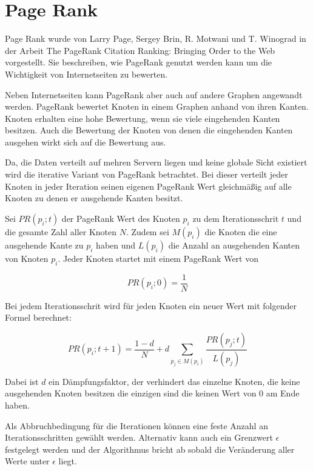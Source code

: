 \section{Page Rank}

Page Rank wurde von Larry Page, Sergey Brin, R. Motwani und T. Winograd in der Arbeit The PageRank Citation Ranking:
Bringing Order to the Web\cite{Page98thepagerank} vorgestellt. Sie beschreiben, wie PageRank genutzt werden kann um die Wichtigkeit von Internetseiten zu bewerten.

Neben Internetseiten kann PageRank aber auch auf andere Graphen angewandt werden.
PageRank bewertet Knoten in einem Graphen anhand von ihren Kanten. Knoten erhalten eine hohe Bewertung, wenn sie viele eingehenden Kanten besitzen. Auch die Bewertung der Knoten von denen die eingehenden Kanten ausgehen wirkt sich auf die Bewertung aus.

Da, die Daten verteilt auf mehren Servern liegen und keine globale Sicht existiert wird die iterative Variant von PageRank betrachtet.
Bei dieser verteilt jeder Knoten in jeder Iteration seinen eigenen PageRank Wert gleichmäßig auf alle Knoten zu denen er ausgehende Kanten besitzt. 


Sei $ PR(p_{i}; t)$ der PageRank Wert des Knoten $p_{i}$ zu dem Iterationsschrit $t$ und die gesamte Zahl aller Knoten $N$.
Zudem sei $M(p_{i})$ die Knoten die eine ausgehende Kante zu $p_{i}$ haben und $L(p_{i})$ die Anzahl an ausgehenden Kanten von Knoten $p_{i}$.
Jeder Knoten startet mit einem PageRank Wert von

\[  PR(p_{i}; 0) = \frac{1}{N}   \]

Bei jedem Iterationsschrit wird für jeden Knoten ein neuer Wert mit folgender Formel berechnet:

\[ PR(p_{i}; t+1) = \frac{1 - d}{N} + d \sum_{p_{j} \in M(p_{i})} \frac{PR(p_{j}; t)}{L(p_{j})} \]


Dabei ist $d$ ein Dämpfungsfaktor, der verhindert das einzelne Knoten, die keine ausgehenden Knoten besitzen die einzigen sind die keinen Wert von 0 am Ende haben.

Als Abbruchbedingung für die Iterationen können eine feste Anzahl an Iterationsschritten gewählt werden. Alternativ kann auch ein Grenzwert $\epsilon$ festgelegt werden und der Algorithmus bricht ab sobald die Veränderung aller Werte unter $\epsilon$ liegt.
